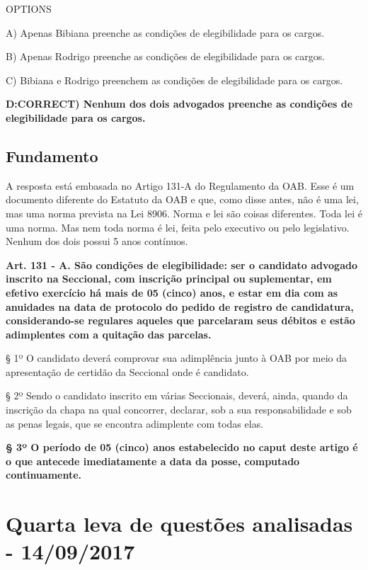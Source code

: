 \documentclass[12pt]{article}
\begin{document}
OPTIONS

A) Apenas Bibiana preenche as condições de elegibilidade 
para os cargos. 

B) Apenas Rodrigo preenche as condições de elegibilidade 
para os cargos. 

C) Bibiana e Rodrigo preenchem as condições de elegibilidade 
para os cargos. 

\textbf{D:CORRECT) Nenhum dos dois advogados preenche as condições de 
elegibilidade para os cargos.}

\subsection{Fundamento}

A resposta está embasada no Artigo 131-A do Regulamento da OAB. Esse é um documento diferente do Estatuto da OAB e que, como disse antes, não é uma lei, mas uma norma prevista na Lei 8906. Norma e lei são coisas diferentes. Toda lei é uma norma. Mas nem toda norma é lei, feita pelo executivo ou pelo legislativo. Nenhum dos dois possui 5 anos contínuos.

\textbf{Art. 131 - A. São condições de elegibilidade: ser o candidato advogado inscrito na Seccional, com inscrição principal ou suplementar, em efetivo exercício há mais de 05 (cinco) anos, e estar em dia com as anuidades na data de protocolo do pedido de registro de candidatura, considerando-se regulares aqueles que parcelaram seus débitos e estão adimplentes com a quitação das parcelas. }

§ 1º O candidato deverá comprovar sua adimplência junto à OAB por meio da apresentação de certidão da Seccional onde é candidato. 

§ 2º Sendo o candidato inscrito em várias Seccionais, deverá, ainda, quando da inscrição da chapa na  qual  concorrer,  declarar,  sob  a  sua  responsabilidade  e  sob  as  penas  legais,  que  se  encontra adimplente com todas elas.

\textbf{§  3º  O  período  de  05  (cinco)  anos  estabelecido  no caput deste  artigo  é  o  que  antecede imediatamente a data da posse, computado continuamente.}
	


\noindent\makebox[\linewidth]{\rule{\paperwidth}{0.4pt}}

\section*{Quarta leva de questões analisadas - 14/09/2017} 
\end{document}
